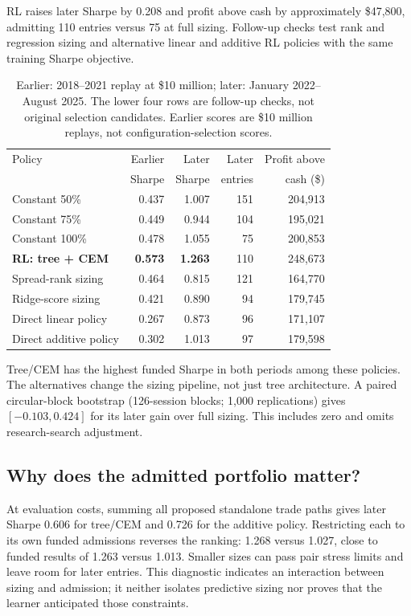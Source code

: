 \documentclass[11pt,letterpaper]{article}
\newcommand{\money}[1]{\$#1}
\begin{document}
RL raises later Sharpe by 0.208 and profit above cash by approximately
\money{47,800}, admitting 110 entries versus 75 at full sizing.
Follow-up checks test rank and regression sizing and alternative linear
and additive RL policies with the same training Sharpe objective.
\begin{table}[H]
\centering\small
\begin{tabular}{lrrrr}
\toprule
Policy & Earlier & Later & Later & Profit above\\
 & Sharpe & Sharpe & entries & cash (\$)\\
\midrule
Constant 50\% & 0.437 & 1.007 & 151 & 204,913\\
Constant 75\% & 0.449 & 0.944 & 104 & 195,021\\
Constant 100\% & 0.478 & 1.055 & 75 & 200,853\\
\textbf{RL: tree + CEM} & \textbf{0.573} & \textbf{1.263} & 110 & 248,673\\
\midrule
Spread-rank sizing & 0.464 & 0.815 & 121 & 164,770\\
Ridge-score sizing & 0.421 & 0.890 & 94 & 179,745\\
Direct linear policy & 0.267 & 0.873 & 96 & 171,107\\
Direct additive policy & 0.302 & 1.013 & 97 & 179,598\\
\bottomrule
\end{tabular}
\caption{Earlier: 2018--2021 replay at \money{10 million}; later:
January 2022--August 2025. The lower four rows are follow-up checks, not
original selection candidates. Earlier scores are \money{10 million}
replays, not configuration-selection scores.}
\label{tab:main}
\end{table}

Tree/CEM has the highest funded Sharpe in both periods among these policies.
The alternatives change the sizing pipeline, not just tree architecture.
A paired circular-block bootstrap (126-session blocks; 1,000 replications)
gives $[-0.103,0.424]$ for its later gain over full sizing. This includes
zero and omits research-search adjustment.

\subsection{Why does the admitted portfolio matter?}
At evaluation costs, summing all proposed standalone trade paths gives later
Sharpe 0.606 for tree/CEM and 0.726 for the additive policy. Restricting each
to its own funded admissions reverses the ranking: 1.268 versus 1.027,
close to funded results of 1.263 versus 1.013. Smaller sizes can pass pair
stress limits and leave room for later entries. This diagnostic indicates an
interaction between sizing and admission; it neither isolates predictive
sizing nor proves that the learner anticipated those constraints.
\end{document}
